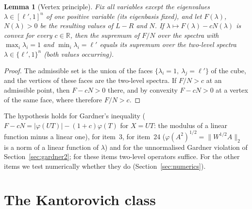 \documentclass[11pt]{article}
\newcommand{\R}{\mathbb{R}}
\theoremstyle{plain}
\newtheorem{lemma}[theorem]{Lemma}
\theoremstyle{definition}
\theoremstyle{remark}
\begin{document}
\begin{lemma}[Vertex principle]\label{lem:vertex}
Fix all variables except the eigenvalues $\lambda\in[\ell',1]^n$ of one positive variable (its eigenbasis fixed), and let
$F(\lambda)$, $N(\lambda)>0$ be the resulting values of $L-R$ and $N$. If $\lambda\mapsto F(\lambda)-cN(\lambda)$ is convex for
every $c\in\R$, then the supremum of $F/N$ over the spectra with $\max_i\lambda_i=1$ and $\min_i\lambda_i=\ell'$ equals its
supremum over the two-level spectra $\lambda\in\{\ell',1\}^n$ (both values occurring).
\end{lemma}
\begin{proof}
The admissible set is the union of the faces $\{\lambda_i=1,\ \lambda_j=\ell'\}$ of the cube, and the vertices of these faces are
the two-level spectra. If $F/N>c$ at an admissible point, then $F-cN>0$ there, and by convexity $F-cN>0$ at a vertex of the
same face, where therefore $F/N>c$.
\end{proof}

\noindent The hypothesis holds for Gardner's inequality ($F-cN=|\varphi(UT)|-(1+c)\varphi(T)$ for $X=UT$: the modulus of a
linear function minus a linear one), for item~3, for item~24 ($\varphi(A^2)^{1/2}=\|W^{1/2}A\|_2$ is a norm of a linear
function of $\lambda$) and for the unnormalised Gardner violation of Section~\ref{sec:gardner2}; for these items two-level
operators suffice. For the other items we test numerically whether they do (Section~\ref{sec:numerics}).

\section{The Kantorovich class}\label{sec:kant}
\end{document}
